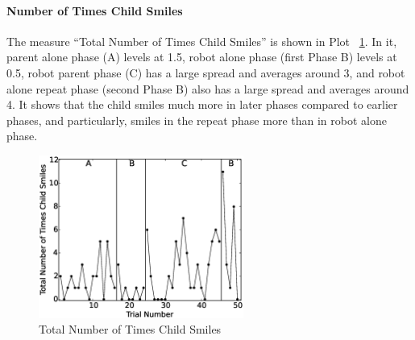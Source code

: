 \paragraph{Number of Times Child Smiles}
The measure ``Total Number of Times Child Smiles'' is shown in Plot \ \ref{fig:12TotalNumberofTimesChildSmiles}.  In it, parent alone phase (A) levels at 1.5, robot alone phase (first Phase B) levels at 0.5, robot parent phase (C) has a large spread and averages around 3, and robot alone repeat phase (second Phase B) also has a large spread and averages around 4.  It shows that the child smiles much more in later phases compared to earlier phases, and particularly, smiles in the repeat phase more than in robot alone phase.
\begin{figure} [h]
	\centering
	\includegraphics[width=0.6\textwidth]{./img/data_analysis/12TotalNumberofTimesChildSmiles.eps}
	\caption{Total Number of Times Child Smiles}
	\label{fig:12TotalNumberofTimesChildSmiles}
\end{figure}



